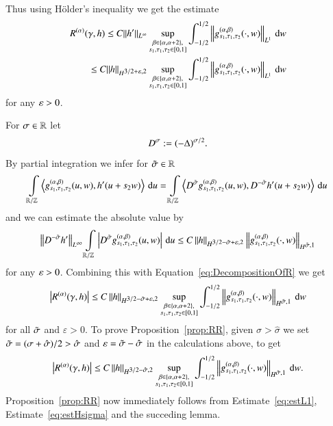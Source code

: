 Thus using H\"older's inequality we get the estimate 
\begin{equation} \label{eq:estL1}
\begin{split}
 \RR(\gamma,h) \leq C \|h'\|_{L^\infty} \sup_{\substack{\beta\in\set{\a,\a+2},\\s_1,\tau_1,\tau_2\in[0,1]}}
 \int_{-1/2}^{1/2}\norm{g^{(\a,\beta)}_{s_1, \tau_1, \tau_2}(\cdot,w)}_{L^1}\d w
 \\ \leq  C \|h\|_{\W[3/2 + \varepsilon, 2]} \sup_{\substack{\beta\in\set{\a,\a+2},\\s_1,\tau_1,\tau_2\in[0,1]}}
 \int_{-1/2}^{1/2}\norm{g^{(\a,\beta)}_{s_1, \tau_1, \tau_2}(\cdot,w)}_{L^1}\d w
\end{split}
\end{equation}
for any $\eps>0$.

For $\s \in\R$ let
\begin{equation}\label{eq:Ds}
 D^\s := (-\Delta)^{\s/2}.
\end{equation}
By partial integration we infer for $\ts \in \mathbb R$
\[ \int\limits_{\R/\Z}
 \sp{g^{(\a,\beta)}_{s_1, \tau_1, \tau_2}(u,w),h'(u+s_2w)}
 \d u
 =\int\limits_{\R/\Z}
 \sp{D^\ts g^{(\a,\beta)}_{s_1, \tau_1, \tau_2}(u,w),D^{-\ts}h'(u+s_2w)}
 \d u \]
and we can estimate the absolute value by
\[ \norm{D^{-\ts}h'}_{\Lp[\infty]}\int\limits_{\R/\Z}
 \abs{D^\ts g^{(\a,\beta)}_{s_1, \tau_1, \tau_2}(u,w)}
 \d u
 \le C\norm{h}_{\W[3/2-\ts+\eps,2]}
 \norm{g^{(\a,\beta)}_{s_1, \tau_1, \tau_2}(\cdot,w)}_{\W[\ts,1]} \]
 for any $\eps>0$.
Combining this with Equation~\eqref{eq:DecompositionOfR} we get
\begin{equation*} %
 \abs{\RR(\g,h)}
 \le C\norm{h}_{\W[3/2-\ts+\eps,2]}\sup_{\substack{\beta\in\set{\a,\a+2},\\s_1,\tau_1,\tau_2\in[0,1]}}
 \int_{-1/2}^{1/2}\norm{g^{(\a,\beta)}_{s_1, \tau_1, \tau_2}(\cdot,w)}_{\W[\ts,1]}\d w
\end{equation*}
for all $\ts$ and $\varepsilon >0$.
To prove Proposition~\ref{prop:RR}, given $\sigma > \hat \sigma $
we set $\ts = (\s + \hat \s)/2 > \hat \s$  and $\varepsilon = \ts-\hat \s$ in the calculations above,
to get
\begin{equation} \label{eq:estHsigma}
 \abs{\RR(\g,h)}
 \le C\norm{h}_{\W[3/2-\hat \s,2]}\sup_{\substack{\beta\in\set{\a,\a+2},\\s_1,\tau_1,\tau_2\in[0,1]}}
 \int_{-1/2}^{1/2}\norm{g^{(\a,\beta)}_{s_1, \tau_1, \tau_2}(\cdot,w)}_{\W[\ts,1]}\d w.
\end{equation}
Proposition~\ref{prop:RR} now immediately follows from Estimate~\eqref{eq:estL1},
Estimate~\eqref{eq:estHsigma} and the succeding lemma.

